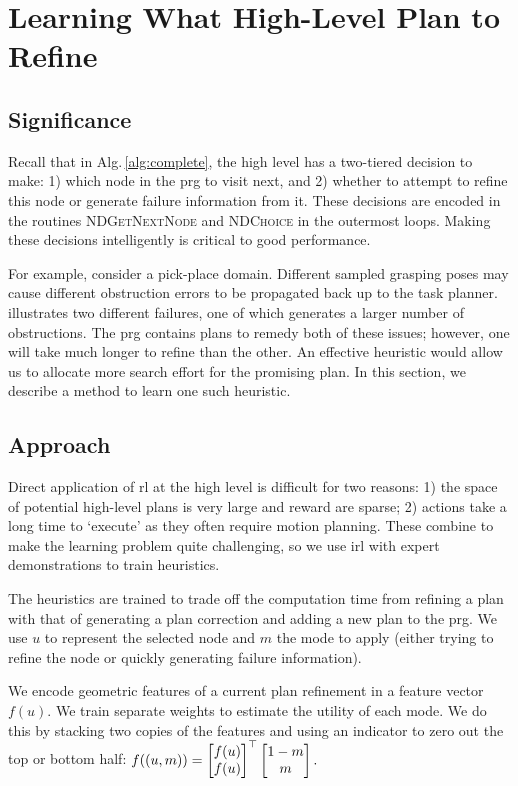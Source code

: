 \section{Learning What High-Level Plan to Refine}
\subsection{Significance}
Recall that in Alg.\,\ref{alg:complete}, the high level has
a two-tiered decision to make: 1) which node in the {\sc prg} to visit
next, and 2) whether to attempt to refine this node or generate
failure information from it. These decisions are encoded in the
routines \textsc{NDGetNextNode} and \textsc{NDChoice} in the outermost loops. Making these
decisions intelligently is critical to good performance. 

For example, consider a pick-place domain. Different sampled grasping
poses may cause different obstruction errors to be propagated back up to
the task planner.  illustrates two different
failures, one of which generates a larger number of obstructions. The
{\sc prg} contains plans to remedy both of these issues; however, one
will take much longer to refine than the other. An effective heuristic
would allow us to allocate more search effort for the promising
plan. In this section, we describe a method to learn one such
heuristic.

\subsection{Approach}
Direct application of {\sc rl} at the high level is difficult for two reasons: 1) the
space of potential high-level plans is very large and reward are
sparse; 2) actions take a long time to `execute' as they often require
motion planning. These combine to make the learning problem quite
challenging, so we use {\sc irl} with expert demonstrations to
train heuristics.

The heuristics are trained to trade off the computation time from
refining a plan with that of generating a plan correction and adding a
new plan to the {\sc prg}. We use $u$ to represent the selected node
and $m$ the mode to apply (either trying to refine the node or
quickly generating failure information).

We encode geometric features of a current plan refinement in a feature
vector $f(u).$ We train separate weights to estimate the utility of
each mode. We do this by stacking two copies of the features and using
an indicator to zero out the top or bottom half: $f((u, m))
= \begin{bmatrix} f(u) \\ f(u) \end{bmatrix}^\top \begin{bmatrix} 1 -
  m \\ m \end{bmatrix}.\vspace{2pt}$ 

